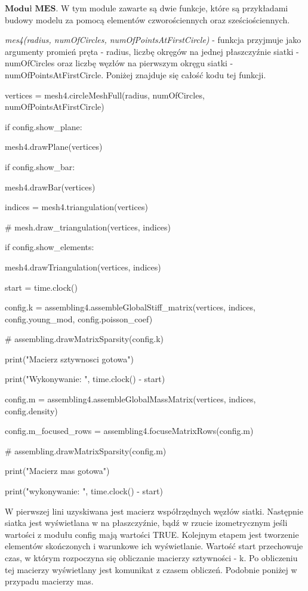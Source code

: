 \vspace {3mm}

 \( \textbf{Moduł MES} \).
W tym module zawarte są dwie funkcje, które są przykładami budowy modelu za pomocą elementów czworościennych oraz sześciościennych.

\textit{mes4(radius, numOfCircles, numOfPointsAtFirstCircle)} - funkcja przyjmuje jako argumenty promień pręta - radius, liczbę okręgów na jednej płaszczyźnie siatki - numOfCircles oraz liczbę węzłów na pierwszym okręgu siatki - numOfPointsAtFirstCircle. Poniżej znajduje się całość kodu tej funkcji.

\vspace {3mm}

    vertices = mesh4.circleMeshFull(radius, numOfCircles, numOfPointsAtFirstCircle)

    if config.show\_plane:

        mesh4.drawPlane(vertices)

    if config.show\_bar:

        mesh4.drawBar(vertices)

\vspace {3mm}
    indices = mesh4.triangulation(vertices)

    \# mesh.draw\_triangulation(vertices, indices)

    if config.show\_elements:

        mesh4.drawTriangulation(vertices, indices)

\vspace {3mm}
    start = time.clock()

    config.k = assembling4.assembleGlobalStiff\_matrix(vertices, indices, config.young\_mod, config.poisson\_coef)

    \# assembling.drawMatrixSparsity(config.k)

    print("Macierz sztywnosci gotowa")

    print("Wykonywanie: ", time.clock() - start)

\vspace {3mm}
    config.m = assembling4.assembleGlobalMassMatrix(vertices, indices, config.density)

    config.m\_focused\_rows = assembling4.focuseMatrixRows(config.m)

    \# assembling.drawMatrixSparsity(config.m)

    print("Macierz mas gotowa")

    print("wykonywanie: ", time.clock() - start)

\vspace {3mm}

W pierwszej lini uzyskiwana jest macierz współrzędnych węzłów siatki. Następnie siatka jest wyświetlana w na płaszczyźnie, bądź w rzucie izometrycznym jeśli wartości z modułu config mają wartości TRUE. Kolejnym etapem jest tworzenie elementów skończonych i warunkowe ich wyświetlanie. Wartość start przechowuje czas, w którym rozpoczyna się obliczanie macierzy sztywności - k. Po obliczeniu tej macierzy wyświetlany jest komunikat z czasem obliczeń.  Podobnie poniżej w przypadu macierzy mas.

